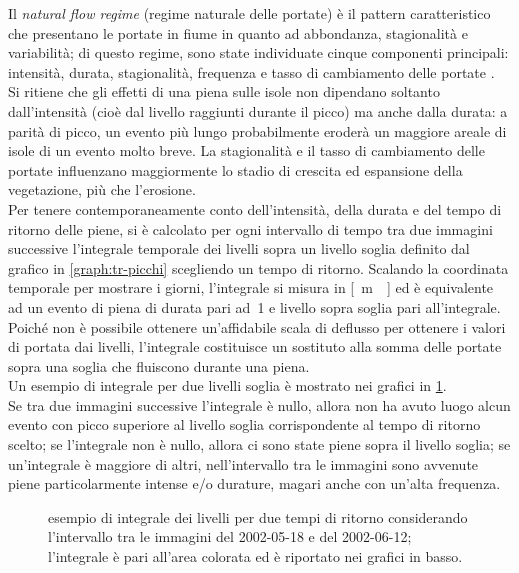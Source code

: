 Il \emph{natural flow regime} (regime naturale delle portate) è il pattern caratteristico che presentano le portate in fiume in quanto ad abbondanza, stagionalità e variabilità; di questo regime, sono state individuate cinque componenti principali: intensità, durata, stagionalità, frequenza e tasso di cambiamento delle portate .
\\
Si ritiene che gli effetti di una piena sulle isole non dipendano soltanto dall'intensità (cioè dal livello raggiunti durante il picco) ma anche dalla durata: a parità di picco, un evento più lungo probabilmente eroderà un maggiore areale di isole di un evento molto breve.
La stagionalità e il tasso di cambiamento delle portate influenzano maggiormente lo stadio di crescita ed espansione della vegetazione, più che l'erosione. 
\\
Per tenere contemporaneamente conto dell'intensità, della durata e del tempo di ritorno delle piene, si è calcolato per ogni intervallo di tempo tra due immagini successive l'integrale temporale dei livelli sopra un livello soglia definito dal grafico in \cref{graph:tr-picchi} scegliendo un tempo di ritorno.
Scalando la coordinata temporale per mostrare i giorni, l'integrale si misura in \si{[\m\giorno]} ed è equivalente ad un evento di piena di durata pari ad~\SI{1}{\giorno} e livello sopra soglia pari all'integrale.
Poiché non è possibile ottenere un'affidabile scala di deflusso per ottenere i valori di portata dai livelli, l'integrale costituisce un sostituto alla somma delle portate sopra una soglia che fluiscono durante una piena.
\\
Un esempio di integrale per due livelli soglia è mostrato nei grafici in \cref{graph:esempio-integrale-livelli}.
\\
Se tra due immagini successive l'integrale è nullo, allora non ha avuto luogo alcun evento con picco superiore al livello soglia corrispondente al tempo di ritorno scelto;
se l'integrale non è nullo, allora ci sono state piene sopra il livello soglia;
se un'integrale è maggiore di altri, nell'intervallo tra le immagini sono avvenute piene particolarmente intense e/o durature, magari anche con un'alta frequenza.
%
\begin{figure}
	\centering
		
	\caption[esempio di integrale dei livelli]{esempio di integrale dei livelli per due tempi di ritorno considerando l'intervallo tra le immagini \AST{} del 2002-05-18 e del 2002-06-12; l'integrale è pari all'area colorata ed è riportato nei grafici in basso.}
	\label{graph:esempio-integrale-livelli}
\end{figure}
%

